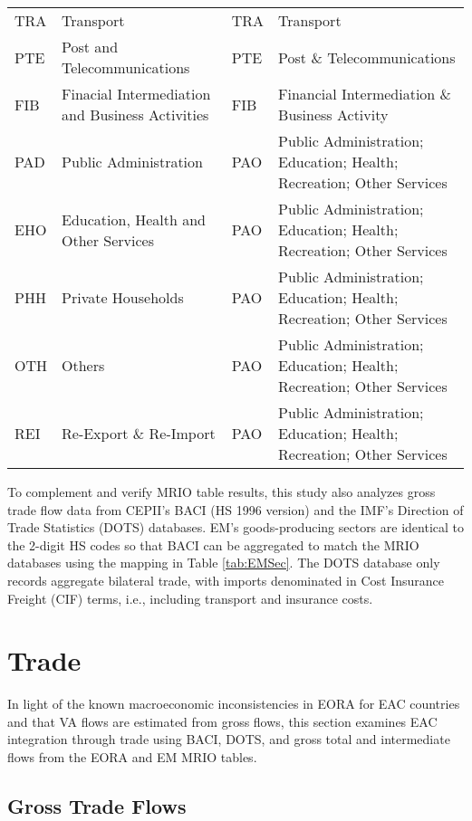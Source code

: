 \documentclass[a4paper]{article}
\begin{document}
\begin{table}[h!]
{\begin{tabular}{llll}
  TRA & Transport & TRA & Transport \\ 
  PTE & Post and Telecommunications & PTE & Post \& Telecommunications \\ 
  FIB & Finacial Intermediation and Business Activities & FIB & Financial Intermediation \& Business Activity \\ 
  PAD & Public Administration & PAO & Public Administration; Education; Health; Recreation; Other Services \\ 
  EHO & Education, Health and Other Services & PAO & Public Administration; Education; Health; Recreation; Other Services \\ 
  PHH & Private Households & PAO & Public Administration; Education; Health; Recreation; Other Services \\ 
  OTH & Others & PAO & Public Administration; Education; Health; Recreation; Other Services \\ 
  REI & Re-Export \& Re-Import & PAO & Public Administration; Education; Health; Recreation; Other Services \\ 
   \bottomrule
\end{tabular}
}
\end{table}
\FloatBarrier

To complement and verify MRIO table results, this study also analyzes gross trade flow data from CEPII's BACI \citep{CEPIIBACI} (HS 1996 version) and the IMF's Direction of Trade Statistics (DOTS) \citep{IMFDOTS} databases. EM's goods-producing sectors are identical to the 2-digit HS codes so that BACI can be aggregated to match the MRIO databases using the mapping in Table \ref{tab:EMSec}. The DOTS database only records aggregate bilateral trade, with imports denominated in Cost Insurance Freight (CIF) terms, i.e., including transport and insurance costs.  


\section{Trade}

In light of the known macroeconomic inconsistencies in EORA for EAC countries and that VA flows are estimated from gross flows, this section examines EAC integration through trade using BACI, DOTS, and gross total and intermediate flows from the EORA and EM MRIO tables. 

\subsection{Gross Trade Flows}
\end{document}
